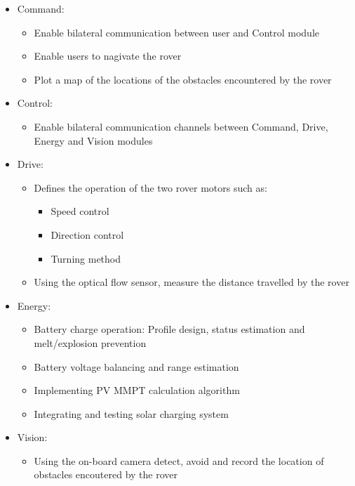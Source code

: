 \documentclass[11pt, a4paper]{article}
\begin{document}
\begin{itemize}
    \item Command:
    \begin{itemize}
        \item Enable bilateral communication between user and Control module 
        \item Enable users to nagivate the rover 
        \item Plot a map of the locations of the obstacles encountered by the rover   
    \end{itemize}

    \item Control:
    \begin{itemize}
        \item Enable bilateral communication channels between Command, Drive, Energy and Vision modules
    \end{itemize}
    
    \item Drive:
    \begin{itemize}
        \item Defines the operation of the two rover motors such as:
        \begin{itemize}
            \item Speed control 
            \item Direction control 
            \item Turning method 
        \end{itemize}
        \item Using the optical flow sensor, measure the distance travelled by the rover 
    \end{itemize}
    
    \item Energy:
    \begin{itemize}
        \item Battery charge operation: Profile design, status estimation and melt/explosion prevention 
        \item Battery voltage balancing and range estimation 
        \item Implementing PV MMPT calculation algorithm 
        \item Integrating and testing solar charging system  
    \end{itemize}
    
    \item Vision:
    \begin{itemize}
        \item Using the on-board camera detect, avoid and record the location of obstacles encoutered by the rover  
    \end{itemize} 
\end{itemize}
\end{document}
